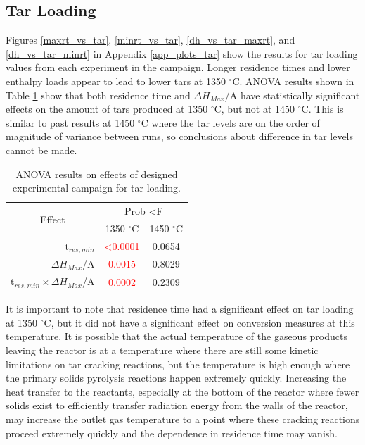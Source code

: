 \documentclass[11pt,twocolumn]{article}
\begin{document}
\subsection*{Tar Loading}

Figures \ref{maxrt_vs_tar}, \ref{minrt_vs_tar}, \ref{dh_vs_tar_maxrt}, and \ref{dh_vs_tar_minrt} in Appendix \ref{app_plots_tar} show the results for tar loading values from each experiment in the campaign.  Longer residence times and lower enthalpy loads appear to lead to lower tars at 1350 $^\circ$C.  ANOVA results shown in Table \ref{anova_tar} show that both residence time and $\Delta H_{Max}$/A have statistically significant effects on the amount of tars produced at 1350 $^\circ$C, but not at 1450 $^\circ$C.  This is similar to past results at 1450 $^\circ$C where the tar levels are on the order of magnitude of variance between runs, so conclusions about difference in tar levels cannot be made.

\begin{table}
	\centering
	\caption{ANOVA results on effects of designed experimental campaign for tar loading.}
	\begin{tabular}{r c c}
		\toprule
		\multicolumn{1}{c}{\multirow{2}{*}{Effect}}		& 	\multicolumn{2}{c}{Prob \textless F	}	\\
		{}								&	1350 $^\circ$C	&	1450 $^\circ$C			\\
		\midrule
		t$_{res,min}$						&	\textcolor{red}{\textless 0.0001}	&	0.0654			\\
		$\Delta H_{Max}$/A					&	\textcolor{red}{0.0015}			&	0.8029			\\
		t$_{res,min}\times \Delta H_{Max}$/A	&	\textcolor{red}{0.0002}			&	0.2309			\\
		\bottomrule
	\end{tabular}
	\label{anova_tar}
\end{table}

It is important to note that residence time had a significant effect on tar loading at 1350 $^\circ$C, but it did not have a significant effect on conversion measures at this temperature.  It is possible that the actual temperature of the gaseous products leaving the reactor is at a temperature where there are still some kinetic limitations on tar cracking reactions, but the temperature is high enough where the primary solids pyrolysis reactions happen extremely quickly.  Increasing the heat transfer to the reactants, especially at the bottom of the reactor where fewer solids exist to efficiently transfer radiation energy from the walls of the reactor, may increase the outlet gas temperature to a point where these cracking reactions proceed extremely quickly and the dependence in residence time may vanish.
\end{document}
